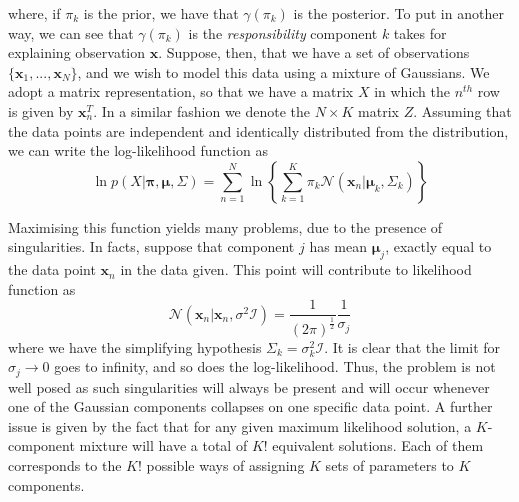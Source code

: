 \documentclass[a4paper]{article}
\begin{document}
 	where, if $\pi_{k}$ is the prior, we have that $\gamma(\pi_{k})$ is the posterior. To put in another way, we can see that $\gamma(\pi_{k})$ is the \textit{responsibility} component $k$ takes for explaining observation $\boldsymbol{x}$.
 	Suppose, then, that we have a set of observations $\{ \boldsymbol{x}_{1}, ..., \boldsymbol{x}_{N} \} $, and we wish to model this data using a mixture of Gaussians. We adopt a matrix representation, so that we have a matrix $X$ in which the $n^{th}$ row is given by $\boldsymbol{x}_{n}^{T}$. In a similar fashion we denote the $N \times K$ matrix $Z$. Assuming that the data points are independent and identically distributed from the distribution, we can write the log-likelihood function as
 	\begin{equation}\label{eqn::log_lik}
 	\ln p \left( X | \boldsymbol{\pi}, \boldsymbol{\mu}, \Sigma \right)
 	= \sum_{n=1}^{N} \ln \left\{ \sum_{k=1}^{K} \pi_{k} \mathcal{N} \left( \boldsymbol{x}_{n} | \boldsymbol{\mu}_{k}, \Sigma_{k} \right) \right\}
 	\end{equation}
 	
 	Maximising this function yields many problems, due to the presence of singularities. In facts, suppose that component $j$ has mean $\boldsymbol{\mu}_{j}$, exactly equal to the data point $\boldsymbol{x}_{n}$ in the data given. This point will contribute to likelihood function as
 	\begin{equation*}
 	\mathcal{N} \left( \boldsymbol{x}_{n} | \boldsymbol{x}_{n}, \sigma^{2} \mathcal{I} \right)
 	= \frac{1}{ \left(2 \pi \right)^{\frac{1}{2}}} \frac{1}{\sigma_{j}}
 	\end{equation*}
 	where we have the simplifying hypothesis $\Sigma_{k} = \sigma_{k}^{2} \mathcal{I}$. It is clear that the limit for $\sigma_{j} \to 0$ goes to infinity, and so does the log-likelihood. Thus, the problem is not well posed as such singularities will always be present and will occur whenever one of the Gaussian components collapses on one specific data point.
 	A further issue is given by the fact that for any given maximum likelihood solution, a $K$-component mixture will have a total of $K!$ equivalent solutions. Each of them corresponds to the $K!$ possible ways of assigning $K$ sets of parameters to $K$ components.
\end{document}
